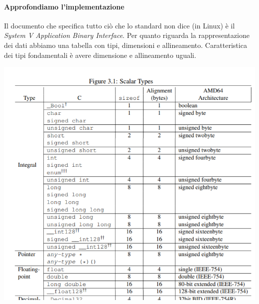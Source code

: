 \documentclass[11pt]{report}
\theoremstyle{definition}
\begin{document}
\paragraph{Approfondiamo l'implementazione} Il documento che specifica tutto ciò che lo standard non dice (in Linux) è il \emph{System V Application Binary Interface}. Per quanto riguarda la rappresentazione dei dati abbiamo una tabella con tipi, dimensioni e allineamento. Caratteristica dei tipi fondamentali è avere dimensione e allineamento uguali.
\begin{center}
\includegraphics[scale=0.85]{img/14.PNG}
\end{center} 
\clearpage 
\end{document}

